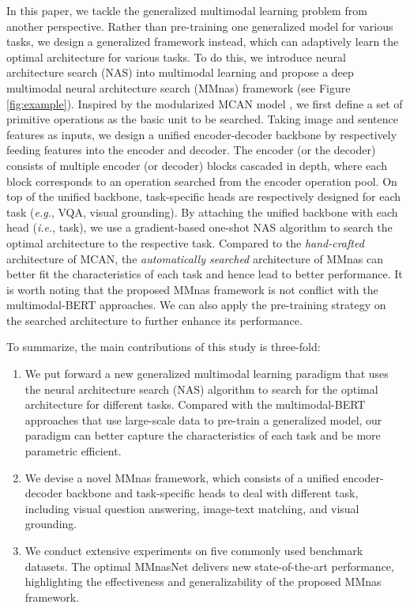 \documentclass[sigconf]{acmart}
\begin{document}
In this paper, we tackle the generalized multimodal learning problem from another perspective. Rather than pre-training one generalized model for various tasks, we design a generalized framework instead, which can adaptively learn the optimal architecture for various tasks. To do this, we introduce neural architecture search (NAS) \cite{zoph2016neural} into multimodal learning and propose a deep multimodal neural architecture search (MMnas) framework (see Figure \ref{fig:example}). Inspired by the modularized MCAN model \cite{yu2019mcan}, we first define a set of primitive operations as the basic unit to be searched. Taking image and sentence features as inputs, we design a unified encoder-decoder backbone by respectively feeding features into the encoder and decoder. The encoder (or the decoder) consists of multiple encoder (or decoder) blocks cascaded in depth, where each block corresponds to an operation searched from the encoder operation pool. On top of the unified backbone, task-specific heads are respectively designed for each task (\emph{e.g.}, VQA, visual grounding). By attaching the unified backbone with each head (\emph{i.e.}, task), we use a gradient-based one-shot NAS algorithm to search the optimal architecture to the respective task. Compared to the \emph{hand-crafted} architecture of MCAN, the \emph{automatically searched} architecture of MMnas can better fit the characteristics of each task and hence lead to better performance. It is worth noting that the proposed MMnas framework is not conflict with the multimodal-BERT approaches. We can also apply the pre-training strategy on the searched architecture to further enhance its performance.

To summarize, the main contributions of this study is three-fold:
\begin{enumerate}
  \item We put forward a new generalized multimodal learning paradigm that uses the neural architecture search (NAS) algorithm to search for the optimal architecture for different tasks. Compared with the multimodal-BERT approaches that use large-scale data to pre-train a generalized model, our paradigm can better capture the characteristics of each task and be more parametric efficient.
  \item We devise a novel MMnas framework, which consists of a unified encoder-decoder backbone and task-specific heads to deal with different task, including visual question answering, image-text matching, and visual grounding.
  \item We conduct extensive experiments on five commonly used benchmark datasets. The optimal MMnasNet delivers new state-of-the-art performance, highlighting the effectiveness and generalizability of the proposed MMnas framework.
\end{enumerate}
\end{document}
